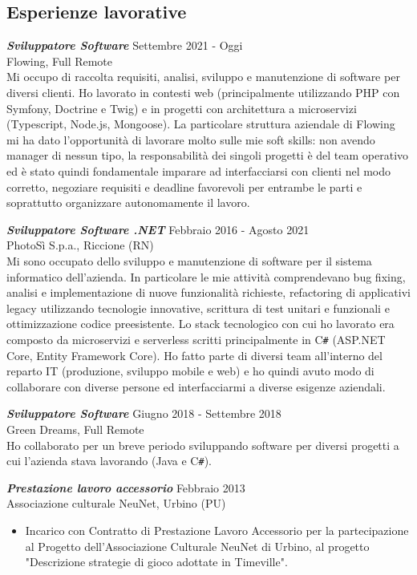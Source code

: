 \documentclass[margin, 10pt]{res} %
\begin{document}
\begin{resume}
\section{Esperienze lavorative}

{\sl \textbf{Sviluppatore Software}} \hfill Settembre 2021 - Oggi \\
Flowing, Full Remote \\
Mi occupo di raccolta requisiti, analisi, sviluppo e manutenzione di software per diversi clienti. Ho lavorato in contesti web (principalmente utilizzando PHP con Symfony, Doctrine e Twig) e in progetti con architettura a microservizi (Typescript, Node.js, Mongoose). La particolare struttura aziendale di Flowing mi ha dato l'opportunit\`a di lavorare molto sulle mie soft skills: non avendo manager di nessun tipo, la responsabilit\`a dei singoli progetti \`e del team operativo ed \`e stato quindi fondamentale imparare ad interfacciarsi con clienti nel modo corretto, negoziare requisiti e deadline favorevoli per entrambe le parti e soprattutto organizzare autonomamente il lavoro.

{\sl \textbf{Sviluppatore Software .NET}} \hfill Febbraio 2016 - Agosto 2021 \\
PhotoS\`i  S.p.a., Riccione (RN) \\
Mi sono occupato dello sviluppo e manutenzione di software per il sistema informatico dell'azienda. In particolare le mie attivit\`a comprendevano bug fixing, analisi e implementazione di nuove funzionalit\`a richieste, refactoring di applicativi legacy utilizzando tecnologie innovative, scrittura di test unitari e funzionali e ottimizzazione codice preesistente. Lo stack tecnologico con cui ho lavorato era composto da microservizi e serverless scritti principalmente in C\texttt{\#} (ASP.NET Core, Entity Framework Core). Ho fatto parte di diversi team all'interno del reparto IT (produzione, sviluppo mobile e web) e ho quindi avuto modo di collaborare con diverse persone ed interfacciarmi a diverse esigenze aziendali.

{\sl \textbf{Sviluppatore Software}} \hfill Giugno 2018 - Settembre 2018 \\
Green Dreams, Full Remote \\
Ho collaborato per un breve periodo sviluppando software per diversi progetti a cui l'azienda stava lavorando (Java e C\texttt{\#}).

{\sl \textbf{Prestazione lavoro accessorio}} \hfill Febbraio 2013 \\
Associazione culturale NeuNet, Urbino (PU) 
\begin{itemize} %
\item Incarico con Contratto di Prestazione Lavoro Accessorio per la partecipazione al Progetto dell'Associazione Culturale NeuNet di Urbino, al progetto "Descrizione strategie di gioco adottate in Timeville". \\
\end{itemize}



\end{resume}
\end{document}
